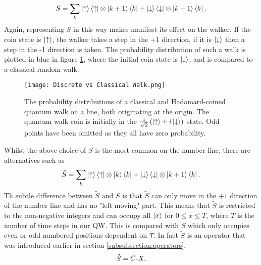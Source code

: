 \begin{equation}
    S = \sum_k \ket{\uparrow}\bra{\uparrow} \otimes \ket{k + 1}\bra{k} + \ket{\downarrow}\bra{\downarrow} \otimes \ket{k - 1}\bra{k}.
\end{equation}
Again, representing $S$ in this way makes manifest its effect on the walker. 
If the coin state is $\ket{\uparrow}$, the walker takes a step in the +1 direction, if it is $\ket{\downarrow}$ then a step in the -1 direction is taken.
The probability distribution of such a walk is plotted in blue in figure \ref{fig:discVSclass}, where the initial coin state is $\ket{\downarrow}$, and is compared to a classical random walk.\newline

\begin{figure}
    \centering
    \texttt{[image: Discrete vs Classical Walk.png]}
    \caption{The probability distributions of a classical and Hadamard-coined quantum walk on a line, both originating at the origin. The quantum walk coin is initially in the $\frac{1}{\sqrt{2}}\left(\ket{\uparrow} + i\ket{\downarrow}\right)$ state. Odd points have been omitted as they all have zero probability.}
    \label{fig:discVSclass}
\end{figure}

Whilst the above choice of $S$ is the most common on the number line, there are alternatives such as
\begin{equation}
    \tilde{S} = \sum_k \ket{\uparrow}\bra{\uparrow} \otimes \ket{k}\bra{k} + \ket{\downarrow}\bra{\downarrow} \otimes \ket{k + 1}\bra{k}.
\end{equation}
Th subtle difference between $\tilde{S}$ and $S$ is that $\tilde{S}$ can only move in the $+1$ direction of the number line and has no "left moving" part.
This means that $\tilde{S}$ is restricted to the non-negative integers and can occupy all $\ket{x}$ for $0\leq x\leq T$, where $T$ is the number of time steps in our QW.
This is compared with $S$ which only occupies even or odd numbered positions dependent on $T$.
In fact $\tilde{S}$ is an operator that was introduced earlier in section \ref{subsubsection:operators},
\begin{equation}
    \tilde{S} = C\text{-}X.
\end{equation}
\FloatBarrier